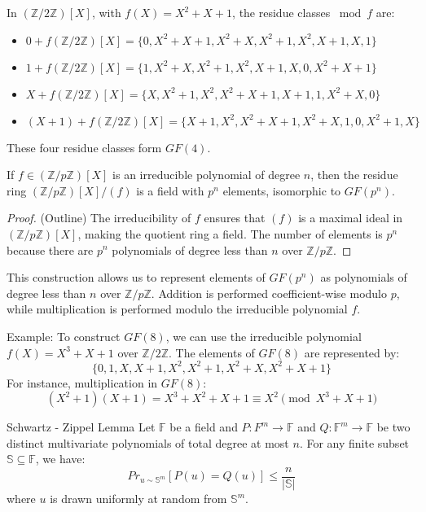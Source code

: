\documentclass{article}
\begin{document}
In $(\mathbb{Z}/2\mathbb{Z})[X]$, with $f(X) = X^2 + X + 1$, the residue classes $\bmod f$ are:
\begin{itemize}
    \item $0 + f(\mathbb{Z}/2\mathbb{Z})[X] = \{0, X^2 + X + 1, X^2 + X, X^2 + 1, X^2, X + 1, X, 1\}$
    \item $1 + f(\mathbb{Z}/2\mathbb{Z})[X] = \{1, X^2 + X, X^2 + 1, X^2, X + 1, X, 0, X^2 + X + 1\}$
    \item $X + f(\mathbb{Z}/2\mathbb{Z})[X] = \{X, X^2 + 1, X^2, X^2 + X + 1, X + 1, 1, X^2 + X, 0\}$
    \item $(X + 1) + f(\mathbb{Z}/2\mathbb{Z})[X] = \{X + 1, X^2, X^2 + X + 1, X^2 + X, 1, 0, X^2 + 1, X\}$
\end{itemize}
These four residue classes form $GF(4)$.

\begin{theorem}{}{}
If $f \in (\mathbb{Z}/p\mathbb{Z})[X]$ is an irreducible polynomial of degree $n$, then the residue ring $(\mathbb{Z}/p\mathbb{Z})[X]/(f)$ is a field with $p^n$ elements, isomorphic to $GF(p^n)$.
\end{theorem}

\begin{proof}
(Outline) The irreducibility of $f$ ensures that $(f)$ is a maximal ideal in $(\mathbb{Z}/p\mathbb{Z})[X]$, making the quotient ring a field. The number of elements is $p^n$ because there are $p^n$ polynomials of degree less than $n$ over $\mathbb{Z}/p\mathbb{Z}$.
\end{proof}

This construction allows us to represent elements of $GF(p^n)$ as polynomials of degree less than $n$ over $\mathbb{Z}/p\mathbb{Z}$. Addition is performed coefficient-wise modulo $p$, while multiplication is performed modulo the irreducible polynomial $f$.


Example: To construct $GF(8)$, we can use the irreducible polynomial $f(X) = X^3 + X + 1$ over $\mathbb{Z}/2\mathbb{Z}$. The elements of $GF(8)$ are represented by:
\[ \{0, 1, X, X+1, X^2, X^2+1, X^2+X, X^2+X+1\} \]
For instance, multiplication in $GF(8)$:
\[ (X^2 + 1)(X + 1) = X^3 + X^2 + X + 1 \equiv X^2 \pmod{X^3 + X + 1} \]

\begin{lemma}{Schwartz - Zippel Lemma}{}
Let $\mathbb{F}$ be a field and $P: F^m \rightarrow \mathbb{F}$ and $Q: \mathbb{F}^m \rightarrow \mathbb{F}$ be two distinct multivariate polynomials of total degree at most $n$. For any finite subset $\mathbb{S} \subseteq \mathbb{F}$, we have:
        \begin{equation}
            Pr_{u \sim \mathbb{S}^{m}}[P(u) = Q(u)] \leq \frac{n}{|\mathbb{S}|}
        \end{equation}
where $u$ is drawn uniformly at random from $\mathbb{S}^m$.
\end{lemma}
\end{document}
